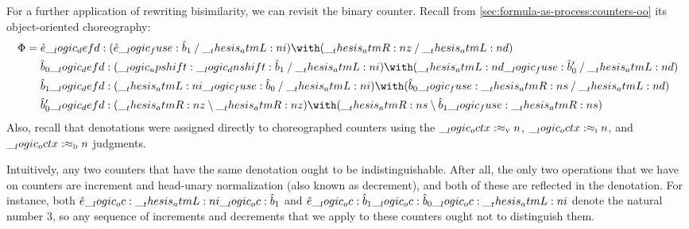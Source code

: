 For a further application of rewriting bisimilarity, we can revisit the binary counter.
Recall from \cref{sec:formula-as-process:counters-oo} its object-oriented choreography:
\begin{equation*}
  \orsig =
  \begin{lgathered}[t]
    \defp{e} \defd (\defp{e} \fuse \defp{b}_1 \pmir \atmL{i}) \with (\atmR{z} \pmir \atmL{d}) \\
    \defp{b}_0 \defd (\up \dn \defp{b}_1 \pmir \atmL{i}) \with (\atmL{d} \fuse \defp{b}'_0 \pmir \atmL{d}) \\
    \defp{b}_1 \defd (\atmL{i} \fuse \defp{b}_0 \pmir \atmL{i}) \with (\defp{b}_0 \fuse \atmR{s} \pmir \atmL{d}) \\
    \defp{b}'_0 \defd (\atmR{z} \limp \atmR{z}) \with (\atmR{s} \limp \defp{b}_1 \fuse \atmR{s})
  \end{lgathered}
\end{equation*}
Also, recall that denotations were assigned directly to choreographed counters using the $\__logic_octx: \approx\sb{\text{\normalfont\scshape v}} n$, $\__logic_octx: \approx\sb{\text{\normalfont\scshape i}} n$, and $\__logic_octx: \approx\sb{\text{\normalfont\scshape d}} n$ judgments.

Intuitively, any two counters that have the same denotation ought to be indistinguishable.
After all, the only two operations that we have on counters are increment and head-unary normalization (also known as decrement), and both of these are reflected in the denotation.
For instance, both $\hat{e} \__logic_oc: \__thesis_atmL:n {i} \__logic_oc: \hat{b}_1$ and $\hat{e} \__logic_oc: \hat{b}_1 \__logic_oc: \hat{b}_0 \__logic_oc: \__thesis_atmL:n {i}$ denote the natural number $3$, so any sequence of increments and decrements that we apply to these counters ought not to distinguish them.


